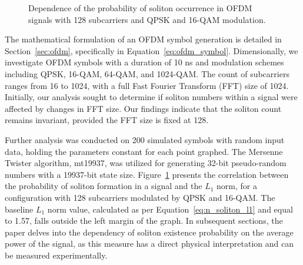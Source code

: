 \begin{figure}[htpb]
    \caption{Dependence of the probability of soliton occurrence in OFDM signals with 128 subcarriers and QPSK and 16-QAM modulation.}
    \label{fig:ofdm_result_1}
\end{figure}

The mathematical formulation of an OFDM symbol generation is detailed in Section~\ref{sec:ofdm}, specifically in Equation~\ref{eq:ofdm_symbol}. Dimensionally, we investigate OFDM symbols with a duration of 10 ns and modulation schemes including QPSK, 16-QAM, 64-QAM, and 1024-QAM. The count of subcarriers ranges from 16 to 1024, with a full Fast Fourier Transform (FFT) size of 1024. Initially, our analysis sought to determine if soliton numbers within a signal were affected by changes in FFT size. Our findings indicate that the soliton count remains invariant, provided the FFT size is fixed at 128.

Further analysis was conducted on 200 simulated symbols with random input data, holding the parameters constant for each point graphed. The Mersenne Twister algorithm, mt19937, was utilized for generating 32-bit pseudo-random numbers with a 19937-bit state size. Figure~\ref{fig:ofdm_result_1} presents the correlation between the probability of soliton formation in a signal and the \( L_1 \) norm, for a configuration with 128 subcarriers modulated by QPSK and 16-QAM. The baseline \( L_1 \) norm value, calculated as per Equation~\ref{eq:n_soliton_l1} and equal to 1.57, falls outside the left margin of the graph. In subsequent sections, the paper delves into the dependency of soliton existence probability on the average power of the signal, as this measure has a direct physical interpretation and can be measured experimentally.


